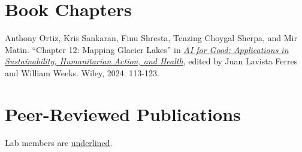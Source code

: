 \documentclass[letterpaper]{article}
\renewenvironment{itemize}{
  \begin{list}{}{
    \setlength{\leftmargin}{1.5em}
  }
}{
  \end{list}
}
\begin{document}
\section*{Book Chapters}
\begin{itemize}
\item Anthony Ortiz, Kris Sankaran, Finu Shresta, Tenzing Choygal Sherpa, and
Mir Matin. “Chapter 12: Mapping Glacier Lakes” in \href{https://www.wiley.com/en-us/AI+for+Good%3A+Applications+in+Sustainability%2C+Humanitarian+Action%2C+and+Health-p-9781394235889}{\textit{AI for Good: Applications in
Sustainability, Humanitarian Action, and Health}}, edited by Juan Lavista Ferres
and William Weeks. Wiley, 2024. 113-123.
\end{itemize}

\section*{Peer-Reviewed Publications}
Lab members are \underline{underlined}.
\end{document}
